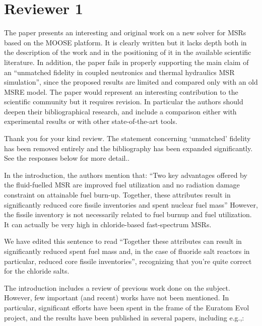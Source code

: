 \documentclass[answers,11pt]{exam}
\begin{document}
\section*{Reviewer 1}
\begin{questions}

\question The paper presents an interesting and original work on a new solver
for MSRs based on the MOOSE platform.  It is clearly written but it lacks depth
both in the description of the work and in the positioning of it in the
available scientific literature.  In addition, the paper fails in properly
supporting the main claim of an ``unmatched fidelity in coupled neutronics and
thermal hydraulics MSR simulation'', since the proposed results are limited and
compared only with an old MSRE model. The paper would represent an interesting
contribution to the scientific community but it requires revision. In
particular the authors should deepen their bibliographical research, and
include a comparison either with experimental results or with other
state-of-the-art tools.
\begin{solution}
        Thank you for your kind review.
        The statement concerning `unmatched' fidelity has been removed
        entirely and the bibliography has been expanded significantly. See the
        responses below for more detail..
\end{solution}


\question In the introduction, the authors mention that: ``Two key advantages
offered by the fluid-fuelled MSR are improved fuel utilization and no radiation
damage constraint on attainable fuel burn-up. Together, these attributes result
in significantly reduced core fissile inventories and spent nuclear fuel mass''
However, the fissile inventory is not necessarily related to fuel burnup and
fuel utilization. It can actually be very high in chloride-based fast-spectrum
MSRs.
\begin{solution}
        We have edited this sentence to read ``Together these attributes can
        result in significantly reduced spent fuel mass and, in the case of
        fluoride salt reactors in particular, reduced core fissile
        inventories'', recognizing that you're quite correct for the chloride salts.
\end{solution}

\question The introduction includes a review of previous work done on the
subject. However, few important (and recent) works have not been mentioned. In
particular, significant efforts have been spent in the frame of the Euratom Evol
project, and the results have been published in several papers, including e.g.,:


\end{questions}
\end{document}
